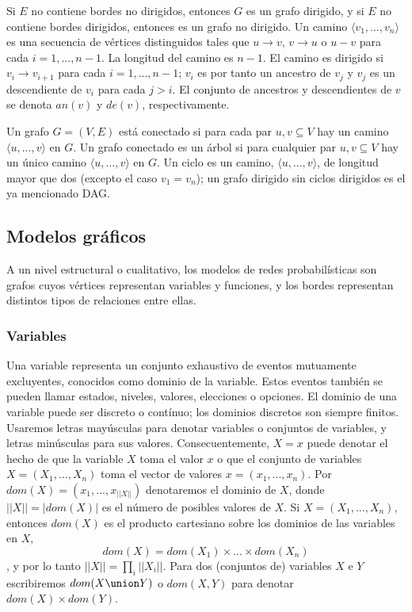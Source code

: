 Si $E$ no contiene bordes no dirigidos, entonces $G$ es un grafo dirigido, y si $E$ no 
contiene bordes dirigidos, entonces es un grafo no dirigido. Un camino $ \langle v_{1},...,v_{n} \rangle $ 
es una secuencia de vértices distinguidos tales que $u \rightarrow v$, $v \rightarrow u$ o $u - v$ para 
cada $i= 1,..., n-1$. 
La longitud del camino es $n-1$. El camino es dirigido si $v_{i} \rightarrow v_{i+1}$ para cada $i= 1,..., n-1$; $v_{i}$ es 
por tanto un ancestro de $v_{j}$ y $v_{j}$ es un descendiente de $v_{i}$ para cada $j > i$. El conjunto de ancestros y 
descendientes de $v$ se denota $an(v)$ y $de(v)$, respectivamente.

Un grafo $G= (V, E)$ está conectado si para cada par ${u, v} \subseteq V$ hay un camino $ \langle u,...,v \rangle$ en $G$. Un 
grafo conectado es un árbol si para cualquier par ${u,v} \subseteq V$ hay un único camino $\langle u,...,v \rangle$ en $G$. Un ciclo 
es un camino, $\langle u,...,v \rangle$, de longitud mayor que dos (excepto el caso $v_{1} = v_{n}$); un grafo dirigido sin ciclos dirigidos 
es el ya mencionado DAG. 

\subsection{Modelos gráficos}
A un nivel estructural o cualitativo, los modelos de redes probabilísticas son grafos cuyos vértices 
representan variables y funciones, y los bordes representan distintos tipos de relaciones entre ellas. 

\subsubsection{Variables}
Una variable representa un conjunto exhaustivo de eventos mutuamente excluyentes, conocidos como dominio de la variable. Estos 
eventos también se pueden llamar estados, niveles, valores, elecciones o opciones. El dominio de una variable puede ser discreto o 
contínuo; los dominios discretos son siempre finitos. Usaremos letras mayúsculas para denotar variables o conjuntos de variables, 
y letras minúsculas para sus valores. Consecuentemente, $X = x$ puede denotar el hecho de que la variable $X$ toma el valor $x$ o que 
el conjunto de variables $X = (X_{1},...,X_{n})$ toma el vector de valores $x = (x_{1},...,x_{n})$. Por $dom(X)= (x_{1},...,x_{||X||})$ 
denotaremos el dominio de $X$, donde $||X|| = |dom(X)|$ es el número de posibles valores de $X$. Si $X = (X_{1},...,X_{n})$, entonces $dom(X)$ 
es el producto cartesiano sobre los dominios de las variables en $X$, $$dom(X)=dom(X_{1})\times ... \times dom(X_{n})$$, y por lo tanto $||X|| = \prod_i ||X_{i}||$. 
Para dos (conjuntos de) variables $X$ e $Y$ escribiremos $dom(X \union Y)$ o $dom(X,Y)$ para denotar $dom(X) \times dom(Y)$.

